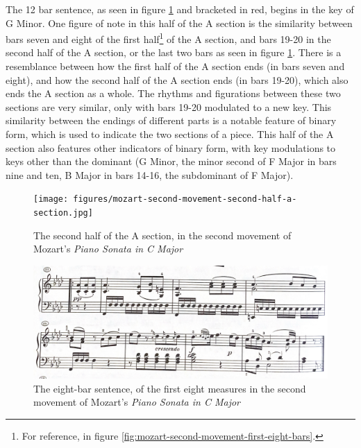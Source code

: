 The 12 bar sentence, as seen in figure \ref{fig:mozart-second-movement-second-half-a-section}\autocite{Henle_1977} and bracketed in red, begins in the key of G Minor. One figure of note in this half of the A section is the similarity between bars seven and eight of the first half\footnote{For reference, in figure \ref{fig:mozart-second-movement-first-eight-bars}.} of the A section, and bars 19-20 in the second half of the A section, or the last two bars as seen in figure \ref{fig:mozart-second-movement-second-half-a-section}\autocite{Henle_1977}. There is a resemblance between how the first half of the A section ends (in bars seven and eight), and how the second half of the A section ends (in bars 19-20), which also ends the A section as a whole. The rhythms and figurations between these two sections are very similar, only with bars 19-20 modulated to a new key. This similarity between the endings of different parts is a notable feature of binary form\autocite{Sutcliffe_Tilmouth_2001}, which is used to indicate the two sections of a piece. This half of the A section also features other indicators of binary form, with key modulations to keys other than the dominant (G Minor, the minor second of F Major in bars nine and ten, B\musFlat{} Major in bars 14-16, the subdominant of F Major).

\begin{figure}
	\centering
	\texttt{[image: figures/mozart-second-movement-second-half-a-section.jpg]}
	\caption{The second half of the A section, in the second movement of Mozart's \textit{Piano Sonata in C Major}}
	\label{fig:mozart-second-movement-second-half-a-section}
\end{figure}

\begin{figure}
	\centering
	\includegraphics[width=\textwidth]{figures/mozart-second-movement-b-section-eight-bar-sentence.jpg}
	\caption{The eight-bar sentence, of the first eight measures in the second movement of Mozart's \textit{Piano Sonata in C Major}}
	\label{fig:mozart-second-movement-b-section-eight-bar-sentence}
\end{figure}

